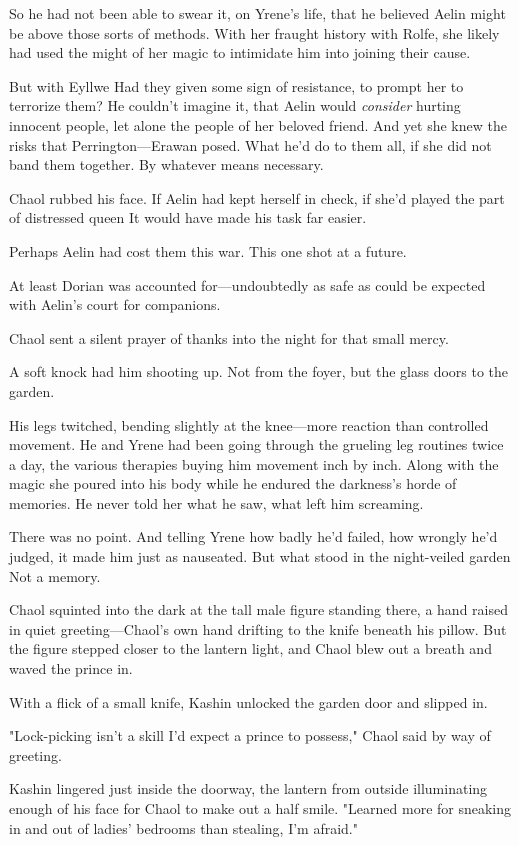 So he had not been able to swear it, on Yrene's life, that he believed Aelin might be above those sorts of methods. With her fraught history with Rolfe, she likely had used the might of her magic to intimidate him into joining their cause.

But with Eyllwe  Had they given some sign of resistance, to prompt her to terrorize them? He couldn't imagine it, that Aelin would
\emph{consider} hurting innocent people, let alone the people of her beloved friend. And yet she knew the risks that Perrington---Erawan posed. What he'd do to them all, if she did not band them together. By whatever means necessary.

Chaol rubbed his face. If Aelin had kept herself in check, if she'd played the part of distressed queen  It would have made his task far easier.

Perhaps Aelin had cost them this war. This one shot at a future.

At least Dorian was accounted for---undoubtedly as safe as could be expected with Aelin's court for companions.

Chaol sent a silent prayer of thanks into the night for that small mercy.

A soft knock had him shooting up. Not from the foyer, but the glass doors to the garden.

His legs twitched, bending slightly at the knee---more reaction than controlled movement. He and Yrene had been going through the grueling leg routines twice a day, the various therapies buying him movement inch by inch. Along with the magic she poured into his body while he endured the darkness's horde of memories. He never told her what he saw, what left him screaming.

There was no point. And telling Yrene how badly he'd failed, how wrongly he'd judged, it made him just as nauseated. But what stood in the night-veiled garden  Not a memory.

Chaol squinted into the dark at the tall male figure standing there, a hand raised in quiet greeting---Chaol's own hand drifting to the knife beneath his pillow. But the figure stepped closer to the lantern light, and Chaol blew out a breath and waved the prince in.

With a flick of a small knife, Kashin unlocked the garden door and slipped in.

"Lock-picking isn't a skill I'd expect a prince to possess," Chaol said by way of greeting.

Kashin lingered just inside the doorway, the lantern from outside illuminating enough of his face for Chaol to make out a half smile. "Learned more for sneaking in and out of ladies' bedrooms than stealing, I'm afraid."

